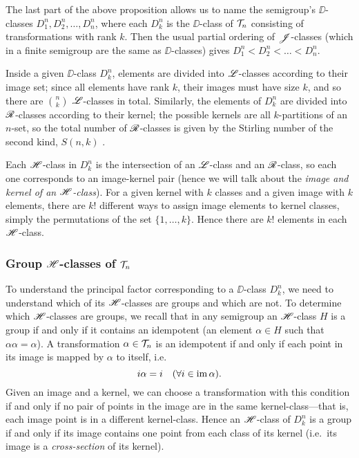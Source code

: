 The last part of the above proposition allows us to name the semigroup's
$\DD$-classes $D_1^n, D_2^n, \dots, D_n^n$, where each $D_k^n$ is the
$\DD$-class of $\mathcal{T}_n$ consisting of transformations with rank $k$.  Then the
usual partial ordering of $\mathrel{\mathscr{J}}$-classes (which in a finite semigroup are the
same as $\DD$-classes) gives $D_1^n < D_2^n < \dots < D_n^n$.

Inside a given $\DD$-class $D_k^n$, elements are divided into $\mathrel{\mathscr{L}}$-classes
according to their image set; since all elements have rank $k$, their images
must have size $k$, and so there are $\binom{n}{k}$ $\mathrel{\mathscr{L}}$-classes in total.
Similarly, the elements of $D_k^n$ are divided into $\mathrel{\mathscr{R}}$-classes according to
their kernel; the possible kernels are all $k$-partitions of an $n$-set, so the
total number of $\mathrel{\mathscr{R}}$-classes is given by the Stirling number of the second
kind, $S(n,k)$ .

Each $\mathrel{\mathscr{H}}$-class in $D_k^n$ is the intersection of an $\mathrel{\mathscr{L}}$-class and an
$\mathrel{\mathscr{R}}$-class, so each one corresponds to an image-kernel pair (hence we will talk
about the \textit{image and kernel of an $\mathrel{\mathscr{H}}$-class}).  For a given kernel with
$k$ classes and a given image with $k$ elements, there are $k!$ different ways
to assign image elements to kernel classes, simply the permutations of the set
$\{1, \dots, k\}$.  Hence there are $k!$ elements in each $\mathrel{\mathscr{H}}$-class.

\subsubsection{Group $\mathrel{\mathscr{H}}$-classes of $\mathcal{T}_n$}
To understand the principal factor corresponding to a $\DD$-class $D_k^n$, we need
to understand which of its $\mathrel{\mathscr{H}}$-classes are groups and which are not.  To
determine which $\mathrel{\mathscr{H}}$-classes are groups, we recall that in any semigroup an
$\mathrel{\mathscr{H}}$-class $H$ is a group if and only if it contains an idempotent (an element
$\alpha \in H$ such that $\alpha \alpha = \alpha$).  A transformation
$\alpha \in \mathcal{T}_n$ is an idempotent if and only if each point in its image is
mapped by $\alpha$ to itself, i.e.
$$i \alpha = i \quad (\forall i \in \operatorname{im} \alpha).$$
Given an image and a kernel, we can choose a transformation with this condition
if and only if no pair of points in the image are in the same
kernel-class---that is, each image point is in a different kernel-class.  Hence
an $\mathrel{\mathscr{H}}$-class of $D_k^n$ is a group if and only if its image contains one point
from each class of its kernel (i.e.~its image is a \textit{cross-section} of its
kernel).  

